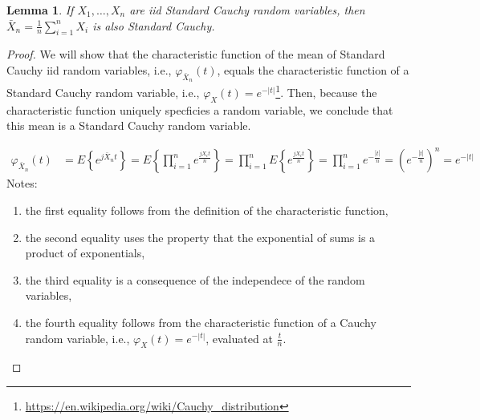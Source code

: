 \documentclass[12pt]{article}
\newtheorem{lemma}{Lemma}
\begin{document}
\begin{appendices}
\begin{figure}[H]
\end{figure}

\begin{lemma}
    If $X_1,\ldots,X_n$ are iid Standard Cauchy random variables, then
    $\bar{X}_n=\frac{1}{n}\sum_{i=1}^nX_i$ is also Standard Cauchy.
    \label{lemma:samleMeanOfStdCauchyIsStdCauchy}
\end{lemma}
\begin{proof}

    We will show that the characteristic function of the mean of Standard
    Cauchy iid random variables, i.e., $\varphi_{\bar{X}_n}(t)$, equals the
    characteristic function of a Standard Cauchy random variable, i.e.,
    $\varphi_X(t)=e^{-|t|}$\footnote{\url{https://en.wikipedia.org/wiki/Cauchy_distribution}}.
    Then, because the characteristic function uniquely specficies a random
    variable, we conclude that this mean is a Standard Cauchy random variable.

    \begin{align}
        \varphi_{\bar{X}_n}(t)&=E\left\{e^{j\bar{X}_nt}\right\}=E\left\{\prod_{i=1}^ne^{\frac{jX_it}{n}}\right\}=\prod_{i=1}^nE\left\{e^{\frac{jX_it}{n}}\right\}=\prod_{i=1}^ne^{-\frac{|t|}{n}}=\left(e^{-\frac{|t|}{n}}\right)^n=e^{-|t|}
    \end{align}
    Notes:
    \begin{enumerate}

        \item the first equality follows from the definition of the
            characteristic function,

        \item the second equality uses the property that the exponential of
            sums is a product of exponentials,

        \item the third equality is a consequence of the independece of the
            random variables,

        \item the fourth equality follows from the characteristic function of a
            Cauchy random variable, i.e., $\varphi_X(t)=e^{-|t|}$, evaluated at
            $\frac{t}{n}$.
    \end{enumerate}

\end{proof}
\end{appendices}
\end{document}
